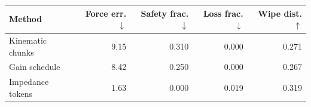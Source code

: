 \begin{tabular}{lrrrr}\toprule
Method & Force err. $\downarrow$ & Safety frac. $\downarrow$ & Loss frac. $\downarrow$ & Wipe dist. $\uparrow$ \\
\midrule
Kinematic chunks & 9.15 & 0.310 & 0.000 & 0.271 \\
Gain schedule & 8.42 & 0.250 & 0.000 & 0.267 \\
Impedance tokens & 1.63 & 0.000 & 0.019 & 0.319 \\
\bottomrule
\end{tabular}
